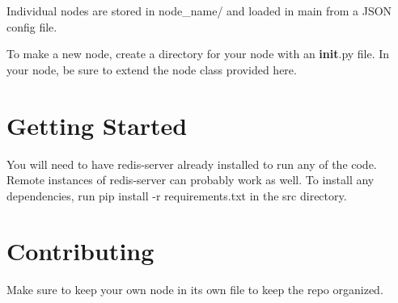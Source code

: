 Individual nodes are stored in \textquotesingle{}node\+\_\+name/\textquotesingle{} and loaded in \textquotesingle{}main\textquotesingle{} from a J\+S\+ON config file.

To make a new node, create a directory for your node with an {\bfseries init}.py file. In your node, be sure to extend the \textquotesingle{}node\textquotesingle{} class provided here.

\section*{Getting Started}

You will need to have redis-\/server already installed to run any of the code. Remote instances of redis-\/server can probably work as well. To install any dependencies, run {\ttfamily pip install -\/r requirements.\+txt} in the {\ttfamily src} directory.

\section*{Contributing}

Make sure to keep your own node in its own file to keep the repo organized. 